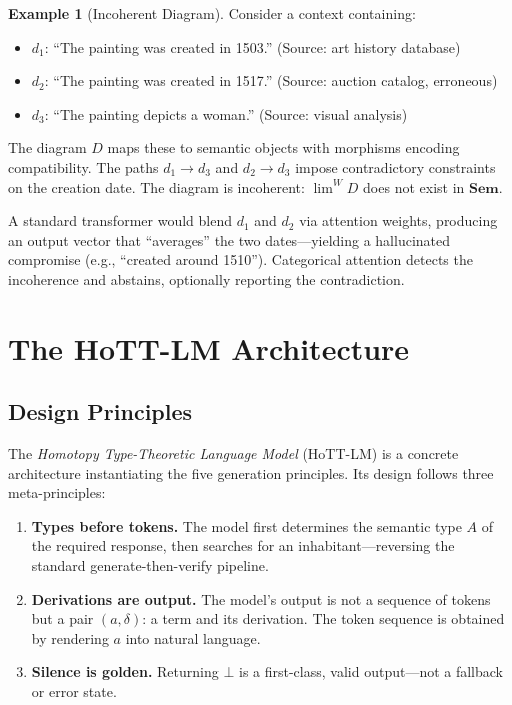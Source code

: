 \documentclass[11pt,a4paper]{article}
\theoremstyle{plain}
\theoremstyle{definition}
\newtheorem{example}[theorem]{Example}
\theoremstyle{remark}
\newcommand{\Sem}{\mathbf{Sem}}
\begin{document}
\begin{example}[Incoherent Diagram]\label{ex:incoherent}
Consider a context containing:
\begin{itemize}[nosep]
  \item $d_1$: ``The painting was created in 1503.'' (Source: art history database)
  \item $d_2$: ``The painting was created in 1517.'' (Source: auction catalog, erroneous)
  \item $d_3$: ``The painting depicts a woman.'' (Source: visual analysis)
\end{itemize}
The diagram $D$ maps these to semantic objects with morphisms encoding compatibility.
The paths $d_1 \to d_3$ and $d_2 \to d_3$ impose contradictory constraints on the creation date.
The diagram is incoherent: $\lim^W D$ does not exist in $\Sem$.

A standard transformer would blend $d_1$ and $d_2$ via attention weights, producing an output vector that ``averages'' the two dates---yielding a hallucinated compromise (e.g., ``created around 1510'').
Categorical attention detects the incoherence and abstains, optionally reporting the contradiction.
\end{example}

\section{The HoTT-LM Architecture}\label{sec:architecture}

\subsection{Design Principles}

The \emph{Homotopy Type-Theoretic Language Model} (HoTT-LM) is a concrete architecture instantiating the five generation principles.
Its design follows three meta-principles:

\begin{enumerate}[nosep]
  \item \textbf{Types before tokens.} The model first determines the semantic type $A$ of the required response, then searches for an inhabitant---reversing the standard generate-then-verify pipeline.
  \item \textbf{Derivations are output.} The model's output is not a sequence of tokens but a pair $(a, \delta)$: a term and its derivation. The token sequence is obtained by rendering $a$ into natural language.
  \item \textbf{Silence is golden.} Returning $\bot$ is a first-class, valid output---not a fallback or error state.
\end{enumerate}
\end{document}
